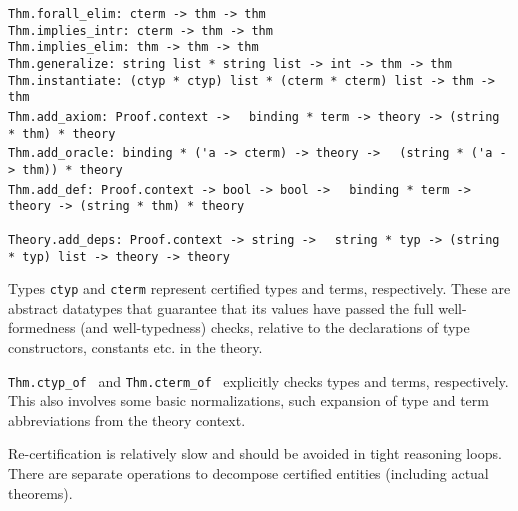 \begin{isabellebody}
\begin{isamarkuptext}
\begin{mldecls}
  \verb|Thm.forall_elim: cterm -> thm -> thm| \\
  \verb|Thm.implies_intr: cterm -> thm -> thm| \\
  \verb|Thm.implies_elim: thm -> thm -> thm| \\
  \verb|Thm.generalize: string list * string list -> int -> thm -> thm| \\
  \verb|Thm.instantiate: (ctyp * ctyp) list * (cterm * cterm) list -> thm -> thm| \\
  \verb|Thm.add_axiom: Proof.context ->|\isasep\isanewline%
\verb|  binding * term -> theory -> (string * thm) * theory| \\
  \verb|Thm.add_oracle: binding * ('a -> cterm) -> theory ->|\isasep\isanewline%
\verb|  (string * ('a -> thm)) * theory| \\
  \verb|Thm.add_def: Proof.context -> bool -> bool ->|\isasep\isanewline%
\verb|  binding * term -> theory -> (string * thm) * theory| \\
  \end{mldecls}
  \begin{mldecls}
  \verb|Theory.add_deps: Proof.context -> string ->|\isasep\isanewline%
\verb|  string * typ -> (string * typ) list -> theory -> theory| \\
  \end{mldecls}

  \begin{description}

  \item Types \verb|ctyp| and \verb|cterm| represent certified
  types and terms, respectively.  These are abstract datatypes that
  guarantee that its values have passed the full well-formedness (and
  well-typedness) checks, relative to the declarations of type
  constructors, constants etc. in the theory.

  \item \verb|Thm.ctyp_of|~ and \verb|Thm.cterm_of|~ explicitly checks types and terms,
  respectively.  This also involves some basic normalizations, such
  expansion of type and term abbreviations from the theory context.

  Re-certification is relatively slow and should be avoided in tight
  reasoning loops.  There are separate operations to decompose
  certified entities (including actual theorems).


\end{description}
\end{isamarkuptext}
\end{isabellebody}
